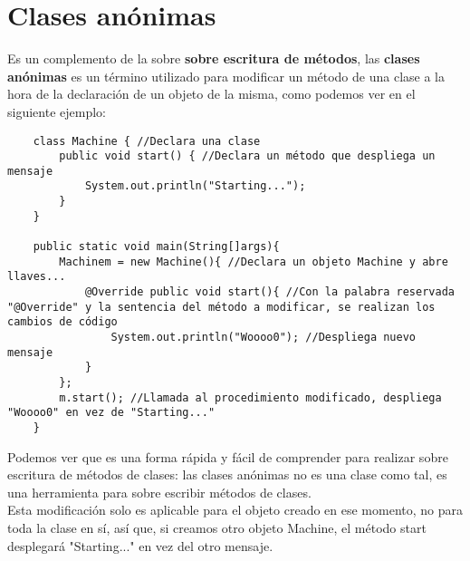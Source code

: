 \section{Clases anónimas}
Es un complemento de la sobre \textbf{sobre escritura de métodos}, las \textbf{clases anónimas} es un término utilizado para modificar un método de una clase a la hora de la declaración de un objeto de la misma, como podemos ver en el siguiente ejemplo:
\begin{lstlisting}
    class Machine { //Declara una clase
        public void start() { //Declara un método que despliega un mensaje
            System.out.println("Starting...");
        }
    }
    
    public static void main(String[]args){
        Machinem = new Machine(){ //Declara un objeto Machine y abre llaves...
            @Override public void start(){ //Con la palabra reservada "@Override" y la sentencia del método a modificar, se realizan los cambios de código
                System.out.println("Woooo0"); //Despliega nuevo mensaje
            }
        };
        m.start(); //Llamada al procedimiento modificado, despliega "Woooo0" en vez de "Starting..."
    }
\end{lstlisting}
Podemos ver que es una forma rápida y fácil de comprender para realizar sobre escritura de métodos de clases: las clases anónimas no es una clase como tal, es una herramienta para sobre escribir métodos de clases.\\
Esta modificación solo es aplicable para el objeto creado en ese momento, no para toda la clase en sí, así que, si creamos otro objeto Machine, el método start desplegará "Starting..." en vez del otro mensaje.



